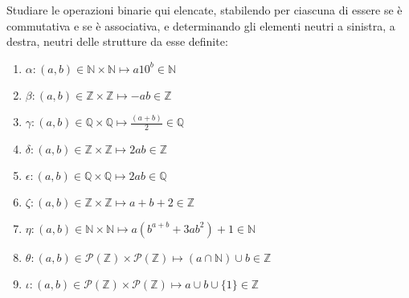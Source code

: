 \begin{exsbox}
	Studiare le operazioni binarie qui elencate, stabilendo per ciascuna di essere se è commutativa e se è associativa, e determinando gli elementi neutri a sinistra, a destra, neutri delle strutture da esse definite:
	\begin{enumerate}
		\item $\alpha: (a,b) \in \mathbb{N} \times \mathbb{N} \mapsto a 10^{b} \in \mathbb{N}$
		\item $\beta:(a,b) \in \mathbb{Z} \times \mathbb{Z} \mapsto -ab \in \mathbb{Z}$
		\item $\gamma:(a,b) \in \mathbb{Q} \times \mathbb{Q} \mapsto \frac{(a+b)}{2} \in \mathbb{Q}$
		\item $\delta: (a,b) \in \mathbb{Z} \times \mathbb{Z} \mapsto 2ab \in \mathbb{Z}$
		\item $\epsilon:(a,b) \in \mathbb{Q} \times \mathbb{Q} \mapsto 2ab \in \mathbb{Q}$
		\item $ \zeta : (a,b) \in \mathbb{Z} \times \mathbb{Z} \mapsto a+b+2 \in \mathbb{Z}$
		\item $\eta : (a,b) \in \mathbb{N} \times \mathbb{N} \mapsto a(b^{a+b}+3ab^{2})+1 \in \mathbb{N}$
		\item $\theta: (a,b) \in \mathcal{P}(\mathbb{Z})\times \mathcal{P}(\mathbb{Z}) \mapsto (a \cap \mathbb{N})\cup b \in \mathbb{Z}$
		\item $\iota : (a,b) \in \mathcal{P}(\mathbb{Z})\times \mathcal{P}(\mathbb{Z}) \mapsto a \cup b \cup \{1\} \in \mathbb{Z}$
	\end{enumerate}
\end{exsbox}
